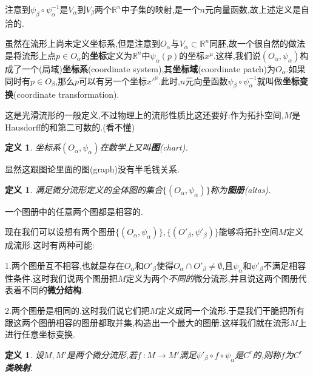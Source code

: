 \documentclass[UTF8]{article}
\begin{document}
	注意到$\psi_{\beta} \circ \psi_{\alpha}^{-1}$是$V_{\alpha}$到$V_{\beta}$两个$\mathbb{R}^n$中子集的映射,是一个$n$元向量函数,故上述定义是自洽的.
	
	虽然在流形上尚未定义坐标系,但是注意到$O_{\alpha}$与$V_{\alpha} \subset \mathbb{R}^n$同胚,故一个很自然的做法是将流形上点$p \in O_{\alpha}$的\textbf{坐标}定义为$\mathbb{R}^n$中$\psi_{\alpha}(p)$的坐标$x^{\mu}$.这样,我们说$(O_{\alpha},\psi_{\alpha})$构成了一个(局域)\textbf{坐标系}(coordinate system),其\textbf{坐标域}(coordinate patch)为$O_{\alpha}$.如果同时有$p \in O_{\beta}$,那么$p$可以有另一个坐标$x'^{\mu}$.此时,$n$元向量函数$\psi_{\beta} \circ \psi_{\alpha}^{-1}$就叫做\textbf{坐标变换}(coordinate transformation).
	
	这是光滑流形的一般定义,不过物理上的流形性质比这还要好:作为拓扑空间,$M$是Hausdorff的和第二可数的.(看不懂)
	
	\newtheorem*{chart}{定义}
	
	\begin{chart}
		坐标系$(O_{\alpha},\psi_{\alpha})$在数学上又叫\textbf{图}(chart).
	\end{chart}
	
	显然这跟图论里面的图(graph)没有半毛钱关系.
	
	\newtheorem*{altas}{定义}
	
	\begin{altas}
		满足微分流形定义的全体图的集合$\{(O_{\alpha},\psi_{\alpha})\}$称为\textbf{图册}(altas).
	\end{altas}
	
	一个图册中的任意两个图都是相容的.
	
	现在我们可以设想有两个图册$\{(O_{\alpha},\psi_{\alpha})\},\{(O'_{\beta},\psi'_{\beta})\}$能够将拓扑空间$M$定义成流形.这时有两种可能:
	
	1.两个图册互不相容,也就是存在$O_{\alpha}$和$O'_{\beta}$使得$O_{\alpha} \cap O'_{\beta} \ne \emptyset$,且$\psi_{\alpha}$和$\psi'_{\beta}$不满足相容性条件.这时我们说两个图册把$M$定义为两个\textit{不同的}微分流形,并且说这两个图册代表着不同的\textbf{微分结构}.
	
	2.两个图册是相同的.这时我们说它们把$M$定义成同一个流形.于是我们干脆把所有跟这两个图册相容的图册都取并集,构造出一个最大的图册.这样我们就在流形$M$上进行任意坐标变换.
	
	\newtheorem*{CrMap}{定义}
	
	\begin{CrMap}
		设$M,M'$是两个微分流形,若$f~: M \to M'$满足$\psi'_{\beta} \circ f \circ \psi_{\alpha}$是$C^{r}$的,则称$f$为\textbf{$C^{r}$类映射}.
	\end{CrMap}
\end{document}

